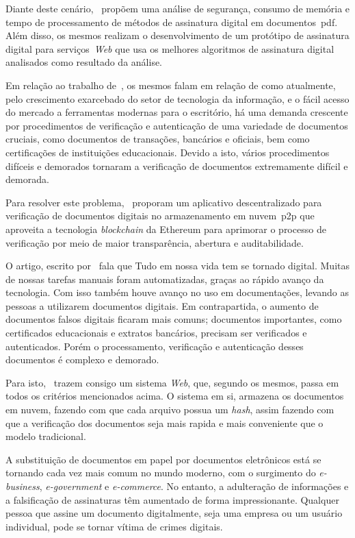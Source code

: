 Diante deste cenário,~\textcite{ramadhan2023} propõem uma análise de segurança,
consumo de memória e tempo de processamento de métodos de assinatura
digital em documentos~\acrshort{pdf}.
Além disso, os mesmos realizam o desenvolvimento de um protótipo de
assinatura digital para serviços~\textit{Web} que usa os melhores
algoritmos de assinatura digital analisados como resultado da análise.

Em relação ao trabalho de~\textcite{iman2021}, os mesmos falam em relação de
como atualmente, pelo crescimento exarcebado do setor de tecnologia da
informação, e o fácil acesso do mercado a ferramentas modernas para o
escritório, há uma demanda crescente por procedimentos de verificação e
autenticação de uma variedade de documentos cruciais, como documentos de
transações, bancários e oficiais, bem como certificações de instituições
educacionais.
Devido a isto, vários procedimentos difíceis e demorados tornaram a verificação
de documentos extremamente difícil e demorada.

Para resolver este problema,~\textcite{iman2021} proporam um aplicativo \textcite{Web}
descentralizado para verificação de documentos digitais no armazenamento em
nuvem~\acrfull{p2p} que aproveita a tecnologia \textit{blockchain} da
Ethereum para aprimorar o processo de verificação por meio de maior
transparência, abertura e auditabilidade.

O artigo, escrito por~\textcite{shree2022} fala que Tudo em nossa vida tem se
tornado digital.
Muitas de nossas tarefas manuais foram automatizadas, graças ao rápido avanço
da tecnologia.
Com isso também houve avanço no uso em documentações, levando as pessoas a
utilizarem documentos digitais.
Em contrapartida, o aumento de documentos falsos digitais ficaram mais
comuns; documentos importantes, como certificados educacionais e extratos
bancários, precisam ser verificados e autenticados.
Porém o processamento, verificação e autenticação desses documentos é complexo e
demorado.

Para isto,~\textcite{shree2022} trazem consigo um sistema \textit{Web}, que,
segundo os mesmos, passa em todos os critérios mencionados acima.
O sistema em si, armazena os documentos em nuvem, fazendo com que cada
arquivo possua um \textit{hash}\hashfootnote, assim fazendo com que a
verificação dos
documentos seja mais rapida e mais conveniente que o modelo tradicional.

A substituição de documentos em papel por documentos eletrônicos está se
tornando
cada vez mais comum no mundo moderno, com o surgimento do \textit{e-business},
\textit{e-government} e \textit{e-commerce}.
No entanto, a adulteração de informações e a falsificação de assinaturas têm
aumentado de forma impressionante.
Qualquer pessoa que assine um documento digitalmente, seja uma empresa ou um
usuário individual, pode se tornar vítima de crimes digitais\cite{
    chakraborty2016}.

